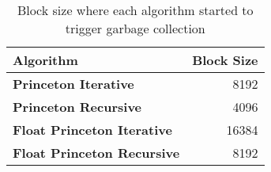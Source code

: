 \ifrelease
\begin{table}[H]
    \centering
    \caption{Block size where each algorithm started to trigger garbage collection}
    \label{tab:result:gc:trigger:2}
    \begin{tabular}{lr}\toprule
        \textbf{Algorithm} & \textbf{Block Size}\\\midrule
        \textbf{Princeton Iterative} & 8192\\
        \textbf{Princeton Recursive} & 4096\\
        \textbf{Float Princeton Iterative} & 16384\\
        \textbf{Float Princeton Recursive} & 8192\\
        \bottomrule
    \end{tabular}
\end{table}
\fi
